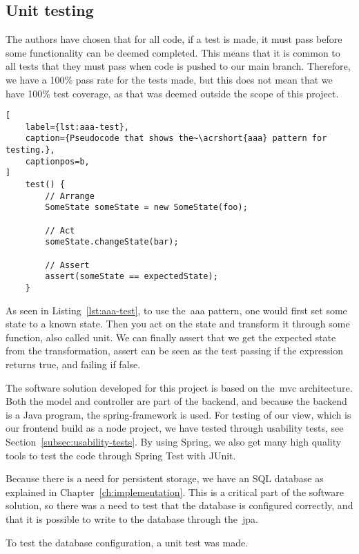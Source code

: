 \subsection{Unit testing}\label{subsec:unit-tests}

The authors have chosen that for all code, if a test is made, it must pass before some functionality can be
deemed completed.
This means that it is common to all tests that they must pass when code is pushed to our main branch.
Therefore, we have a 100\% pass rate for the tests made, but this does not mean that we
have 100\% test coverage, as that was deemed outside the scope of this project.

\begin{lstlisting}[
    label={lst:aaa-test},
    caption={Pseudocode that shows the~\acrshort{aaa} pattern for testing.},
    captionpos=b,
]
    test() {
        // Arrange
        SomeState someState = new SomeState(foo);

        // Act
        someState.changeState(bar);

        // Assert
        assert(someState == expectedState);
    }
\end{lstlisting}

As seen in Listing~\ref{lst:aaa-test}, to use the~\acrshort{aaa} pattern,
one would first set some state to a known state.
Then you act on the state and transform it through some function, also called unit.
We can finally assert that we get the expected state from the transformation, assert can be seen
as the test passing if the expression returns true, and failing if false.

The software solution developed for this project is based on the~\acrfull{mvc} architecture.
Both the model and controller are part of the backend, and because the backend is a Java program,
the spring-framework is used.
For testing of our view, which is our frontend build as a node project, we have tested through usability tests,
see Section~\ref{subsec:usability-tests}.
By using Spring, we also get many high quality tools to test the code through Spring Test with JUnit.

Because there is a need for persistent storage, we have an SQL database as explained in Chapter~\ref{ch:implementation}.
This is a critical part of the software solution, so there was a need to test that the database is configured
correctly, and that it is possible to write to the database through the~\acrfull{jpa}.

To test the database configuration, a unit test was made.

